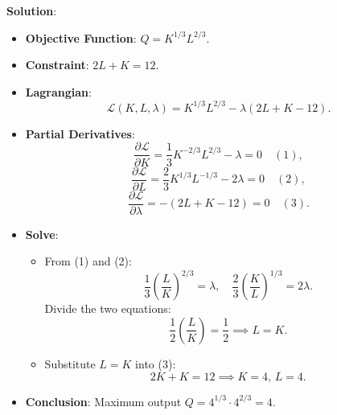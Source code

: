 \documentclass{article}
\begin{document}
\textbf{Solution}:
\begin{itemize}
    \item \textbf{Objective Function}: $ Q = K^{1/3} L^{2/3} $.
    \item \textbf{Constraint}: $ 2L + K = 12 $.
    \item \textbf{Lagrangian}:
    \[
    \mathcal{L}(K, L, \lambda) = K^{1/3} L^{2/3} - \lambda (2L + K - 12).
    \]
    \item \textbf{Partial Derivatives}:
    \[
    \frac{\partial \mathcal{L}}{\partial K} = \frac{1}{3} K^{-2/3} L^{2/3} - \lambda = 0 \quad (1),
    \]
    \[
    \frac{\partial \mathcal{L}}{\partial L} = \frac{2}{3} K^{1/3} L^{-1/3} - 2\lambda = 0 \quad (2),
    \]
    \[
    \frac{\partial \mathcal{L}}{\partial \lambda} = -(2L + K - 12) = 0 \quad (3).
    \]
    \item \textbf{Solve}:
    \begin{itemize}
        \item From (1) and (2):
        \[
        \frac{1}{3} \left( \frac{L}{K} \right)^{2/3} = \lambda, \quad \frac{2}{3} \left( \frac{K}{L} \right)^{1/3} = 2\lambda.
        \]
        Divide the two equations:
        \[
        \frac{1}{2} \left( \frac{L}{K} \right) = \frac{1}{2} \implies L = K.
        \]
        \item Substitute $ L = K $ into (3):
        \[
        2K + K = 12 \implies K = 4, \, L = 4.
        \]
    \end{itemize}
    \item \textbf{Conclusion}: Maximum output $ Q = 4^{1/3} \cdot 4^{2/3} = 4 $.
\end{itemize}
\end{document}
